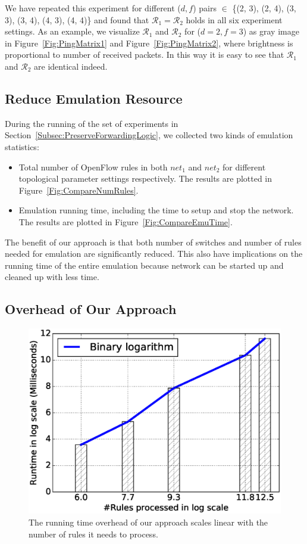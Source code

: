 We have repeated this experiment for different ($d, f$) pairs $\in$
\{(2, 3), (2, 4), (3, 3), (3, 4), (4, 3), (4, 4)\} and found that
$\mathcal{R}_1 = \mathcal{R}_2$ holds in all six experiment settings.
As an example, we visualize $\mathcal{R}_1$ and $\mathcal{R}_2$ for ($d=2, f=3$) as gray image
in Figure~\ref{Fig:PingMatrix1} and Figure~\ref{Fig:PingMatrix2},
where brightness is proportional to number of received packets.
In this way it is easy to see that $\mathcal{R}_1$ and $\mathcal{R}_2$ are identical indeed.


\subsection{Reduce Emulation Resource}
During the running of the set of experiments in Section~\ref{Subsec:PreserveForwardingLogic},
we collected two kinds of emulation statistics:
\begin{itemize}
\item Total number of OpenFlow rules in both $net_1$ and $net_2$ for different topological
        parameter settings respectively.
        The results are plotted in Figure~\ref{Fig:CompareNumRules}.
\item Emulation running time, including the time to setup and stop the network.
        The results are plotted in Figure~\ref{Fig:CompareEmuTime}.
\end{itemize}

The benefit of our approach is that both number of switches and number of rules needed
for emulation are significantly reduced.
This also have implications on the running time of the entire emulation
because network can be started up and cleaned up with less time.

\subsection{Overhead of Our Approach}

\begin{figure}[h]
\centering
\includegraphics[scale=.42]{figures/bs_overhead.eps}
\caption{The running time overhead of our approach scales linear with the number of
        rules it needs to process.}
\label{Fig:BSOverhead}
\end{figure}

